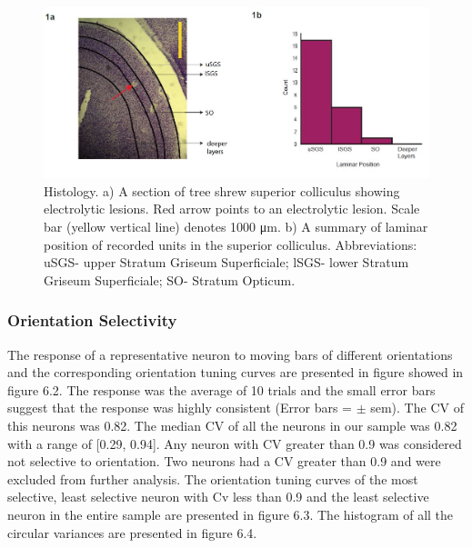 	\begin{figure}
		
		\includegraphics[width=\linewidth]{SCLaminarPosition.jpg}
		\caption{Histology. a) A section of tree shrew superior colliculus showing electrolytic lesions. Red arrow
			points to an electrolytic lesion. Scale bar (yellow vertical line) denotes 1000 μm. b) A summary of laminar
			position of recorded units in the superior colliculus. Abbreviations: uSGS- upper Stratum Griseum Superficiale;
			lSGS- lower Stratum Griseum Superficiale; SO- Stratum Opticum.}
		\label{fig:fig1}
	\end{figure}
	
	
	
	\subsubsection{Orientation Selectivity}
	
		The response of a representative neuron to moving bars of different orientations and the corresponding orientation tuning curves are presented in figure showed in figure 6.2. The response was the average of 10 trials and the small error bars suggest that the response was highly consistent (Error bars = $\pm$ sem). The CV of this neurons was 0.82. The median CV of all the neurons in our sample was 0.82 with a range of [0.29, 0.94]. Any neuron with CV greater than 0.9 was considered not selective to orientation. Two neurons had a CV greater than 0.9 and were excluded from further analysis. The orientation tuning curves of the most selective, least selective neuron with Cv less than 0.9 and the least selective neuron in the entire sample are presented in figure 6.3. The histogram of all the circular variances are presented in figure 6.4.
	
